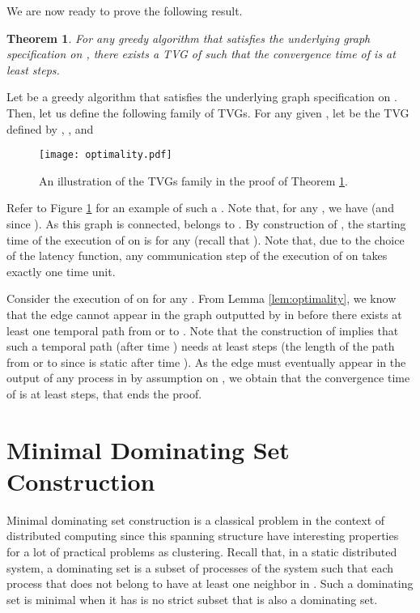 \documentclass{article}
\newtheorem{theorem}{Theorem}
\newenvironment{proof}{{\bf Proof. } }{{\hfill }}
\begin{document}
We are now ready to prove the following result.

\begin{theorem}\label{th:optimality}
For any greedy algorithm  that satisfies the underlying graph specification on , there exists a TVG  of  such that the convergence time of  is at least  steps.
\end{theorem}

\begin{proof}
Let  be a greedy algorithm that satisfies the underlying graph specification on . Then, let us define the following family of TVGs. For any given , let  be the TVG defined by , , and




\begin{figure}
  \centering 
  \texttt{[image: optimality.pdf]}
  \caption{An illustration of the TVGs family in the proof of Theorem \ref{th:optimality}. \label{fig:optimality}}
\end{figure}

Refer to Figure \ref{fig:optimality} for an example of such a . Note that, for any , we have  (and  since ). As this graph is connected,  belongs to . By construction of , the starting time of the execution of  on  is  for any  (recall that ). Note that, due to the choice of the latency function, any communication step of the execution of  on  takes exactly one time unit.

Consider  the execution of  on  for any . From Lemma \ref{lem:optimality}, we know that the edge  cannot appear in the graph outputted by  in  before there exists at least one temporal path from  or  to . Note that the construction of  implies that such a temporal path (after time ) needs at least  steps (the length of the path from  or  to  since  is static after time ). As the edge  must eventually appear in the output of any process in  by assumption on , we obtain that the convergence time of  is at least  steps, that ends the proof.
\end{proof}

\section{Minimal Dominating Set Construction}\label{sec:MDS}

Minimal dominating set construction is a classical problem in the context of distributed computing since this spanning structure have interesting properties for a lot of practical problems as clustering. Recall that, in a static distributed system, a dominating set  is a subset of processes of the system such that each process that does not belong to  have at least one neighbor in . Such a dominating set is minimal when it has is no strict subset that is also a dominating set.
\end{document}
